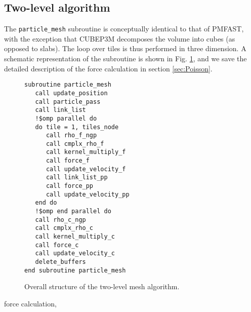 \subsection{Two-level algorithm}
\label{subsec:particle_mesh}

The {\tt particle\_mesh} subroutine is conceptually identical to that of {\small PMFAST}, with the exception  that {\small CUBEP3M}
decomposes the volume into cubes (as opposed to slabs). The loop over tiles is thus performed in three dimension.
A schematic representation of the subroutine is shown in Fig. \ref{fig:particle_mesh}, 
and we save the detailed description of the force calculation  in section \ref{sec:Poisson}.

\begin{figure}
\begin{verbatim}
subroutine particle_mesh
   call update_position
   call particle_pass
   call link_list
   !$omp parallel do
   do tile = 1, tiles_node
      call rho_f_ngp
      call cmplx_rho_f
      call kernel_multiply_f
      call force_f
      call update_velocity_f      
      call link_list_pp
      call force_pp
      call update_velocity_pp
   end do
   !$omp end parallel do
   call rho_c_ngp
   call cmplx_rho_c
   call kernel_multiply_c
   call force_c
   call update_velocity_c      
   delete_buffers
end subroutine particle_mesh
\end{verbatim}
\caption{Overall structure of the two-level mesh algorithm.}
\label{fig:particle_mesh}
\end{figure}

force calculation, 

